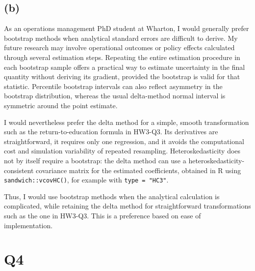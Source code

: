 \documentclass[11pt]{article}
\newcommand{\code}[1]{\texttt{#1}}
\begin{document}
\subsection{(b)}
As an operations management PhD student at Wharton, I would generally
prefer bootstrap methods when analytical standard errors are difficult
to derive. My future research may involve operational outcomes or
policy effects calculated through several estimation steps. Repeating
the entire estimation procedure in each bootstrap sample offers a
practical way to estimate uncertainty in the final quantity without
deriving its gradient, provided the bootstrap is valid for that statistic.
Percentile bootstrap intervals can also reflect
asymmetry in the bootstrap distribution, whereas the usual delta-method
normal interval is symmetric around the point estimate.

I would nevertheless prefer the delta method for a simple, smooth
transformation such as the return-to-education formula in HW3-Q3.
Its derivatives are straightforward, it requires only one regression,
and it avoids the computational cost and simulation variability of
repeated resampling. Heteroskedasticity does not by itself require a
bootstrap: the delta method can use a heteroskedasticity-consistent
covariance matrix for the estimated coefficients, obtained in R using
\code{sandwich::vcovHC()}, for example with \code{type = "HC3"}.

Thus, I would use bootstrap methods when the analytical calculation is
complicated, while retaining the delta method for straightforward
transformations such as the one in HW3-Q3. This is a preference based
on ease of implementation.
\clearpage
\section{Q4}
\label{sec:q4}
\end{document}
